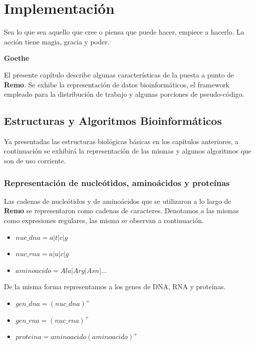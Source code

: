 \chapter{Implementación}
\label{implementacion}

\epigraph{Sea lo que sea aquello que cree
o piensa que puede hacer, empiece a hacerlo.
La acción tiene magia, gracia y poder.}%
{\textbf{Goethe}}

El presente capítulo describe algunas características de la puesta a punto de \textbf{Remo}. Se exhibe la representación de datos bioinformáticos, el framework empleado para la distribución de trabajo y algunas porciones de pseudo-código. 

\section{Estructuras y Algoritmos Bioinformáticos}	
\par Ya presentadas las estructuras biológicas básicas en los capítulos anteriores, a continuación se exhibirá la representación de las mismas y algunos algoritmos que son de uso corriente.

\subsection{Representación de nucleótidos, aminoácidos y proteínas}
\par Las cadenas de nucleótidos y de aminoácidos que se utilizaron a lo largo de \textbf{Remo} se representaron como cadenas de caracteres. Denotamos a las mismas como expresiones regulares, las misma se observan a continuación.
	
\begin{itemize}
	\item $nuc\_dna = a \vert t \vert c \vert g $
	\item $nuc\_rna = a \vert u \vert c \vert g  $	
	\item $aminoacido = Ala \vert Arg \vert Asn \vert ...$	
\end{itemize}
	
\par De la misma forma representamos a los genes de DNA, RNA y proteínas.
		
\begin{itemize}
	\item $gen\_dna = (nuc\_dna)^{+}$	
	\item $gen\_rna = (nuc\_rna)^{+}$	
	\item $proteina = aminoacido (aminoacido)^{+}$
\end{itemize}

